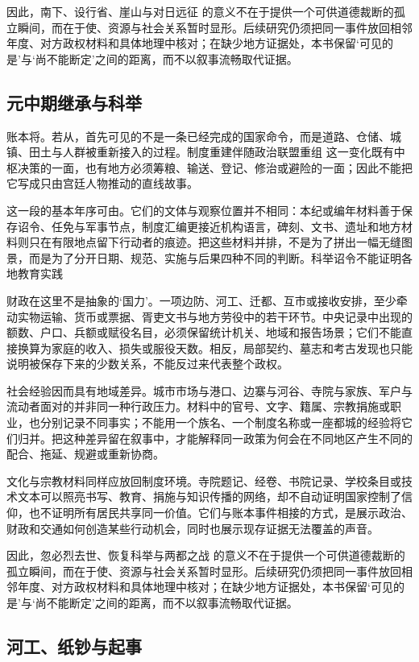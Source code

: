因此，南下、设行省、崖山与对日远征 的意义不在于提供一个可供道德裁断的孤立瞬间，而在于使、资源与社会关系暂时显形。后续研究仍须把同一事件放回相邻年度、对方政权材料和具体地理中核对；在缺少地方证据处，本书保留‘可见的是’与‘尚不能断定’之间的距离，而不以叙事流畅取代证据。

\subsection{元中期继承与科举}

账本将。若从，首先可见的不是一条已经完成的国家命令，而是道路、仓储、城镇、田土与人群被重新接入的过程。制度重建伴随政治联盟重组 这一变化既有中枢决策的一面，也有地方必须筹粮、输送、登记、修治或避险的一面；因此不能把它写成只由宫廷人物推动的直线故事。

这一段的基本年序可由。它们的文体与观察位置并不相同：本纪或编年材料善于保存诏令、任免与军事节点，制度汇编更接近机构语言，碑刻、文书、遗址和地方材料则只在有限地点留下行动者的痕迹。把这些材料并排，不是为了拼出一幅无缝图景，而是为了分开日期、规范、实施与后果四种不同的判断。科举诏令不能证明各地教育实践

财政在这里不是抽象的‘国力’。一项边防、河工、迁都、互市或接收安排，至少牵动实物运输、货币或票据、胥吏文书与地方劳役中的若干环节。中央记录中出现的额数、户口、兵额或赋役名目，必须保留统计机关、地域和报告场景；它们不能直接换算为家庭的收入、损失或服役天数。相反，局部契约、墓志和考古发现也只能说明被保存下来的少数关系，不能反过来代表整个政权。

社会经验因而具有地域差异。城市市场与港口、边寨与河谷、寺院与家族、军户与流动者面对的并非同一种行政压力。材料中的官号、文字、籍属、宗教捐施或职业，也分别记录不同事实；不能用一个族名、一个制度名称或一座都城的经验将它们归并。把这种差异留在叙事中，才能解释同一政策为何会在不同地区产生不同的配合、拖延、规避或重新协商。

文化与宗教材料同样应放回制度环境。寺院题记、经卷、书院记录、学校条目或技术文本可以照亮书写、教育、捐施与知识传播的网络，却不自动证明国家控制了信仰，也不证明所有居民共享同一价值。它们与账本事件相接的方式，是展示政治、财政和交通如何创造某些行动机会，同时也展示现存证据无法覆盖的声音。

因此，忽必烈去世、恢复科举与两都之战 的意义不在于提供一个可供道德裁断的孤立瞬间，而在于使、资源与社会关系暂时显形。后续研究仍须把同一事件放回相邻年度、对方政权材料和具体地理中核对；在缺少地方证据处，本书保留‘可见的是’与‘尚不能断定’之间的距离，而不以叙事流畅取代证据。

\subsection{河工、纸钞与起事}

